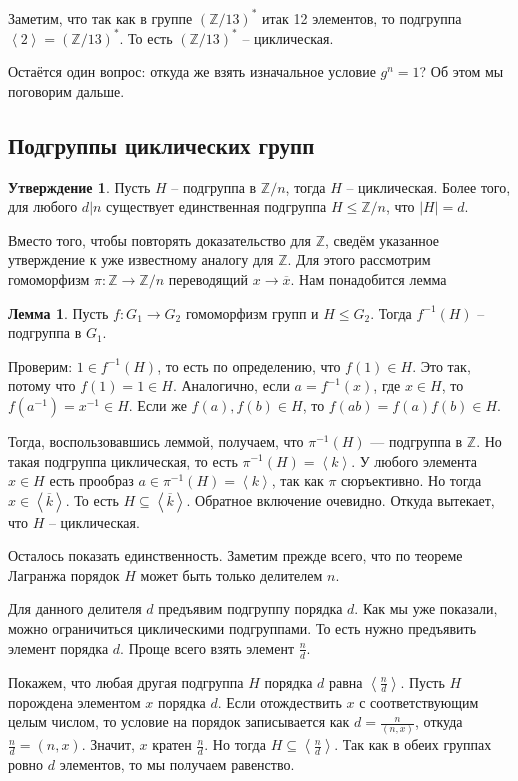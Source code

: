 \documentclass[10pt,a4paper,oneside]{book}
\theoremstyle{definition}
\newtheorem{lem}{\color{green!50!black}Лемма}
\newtheorem{utvr}{\color{blue!50!black}Утверждение}
\renewcommand{\leq}{\leqslant}
\newcommand{\mb}[1]{\mathbb{#1}}
\newcommand{\ovl}{\overline}
\def\lan{\left\langle }
\def\ran{\right\rangle}
\def\lm{\begin{lem}}
\def\elm{\end{lem}}
\def\utv{\begin{utvr}}
\def\eutv{\end{utvr}}
\begin{document}
Заметим, что так как в группе $(\mb Z/13)^*$ итак 12 элементов, то подгруппа $\lan 2\ran =(\mb Z/13)^*$. То есть $(\mb Z/13)^*$ -- циклическая.

Остаётся один вопрос: откуда же взять изначальное условие $g^n=1$? Об этом мы поговорим дальше.

\subsection{Подгруппы циклических групп}

\utv Пусть $H$ -- подгруппа в $\mb Z/n$, тогда $H$ -- циклическая. Более того, для любого $d|n$ существует единственная подгруппа $H\leq \mb Z/n$, что $|H|=d$. 
\eutv
\proof
Вместо того, чтобы повторять доказательство для $\mb Z$, сведём указанное утверждение к уже известному аналогу для $\mb Z$. Для этого рассмотрим гомоморфизм $\pi\colon \mb Z \to \mb Z/n$ переводящий $x\to \ovl{x}$. Нам понадобится лемма

\lm Пусть $f\colon G_1\to G_2$ гомоморфизм групп и $H\leq G_2$. Тогда $f^{-1}(H)$ -- подгруппа в $G_1$.
\elm
\proof Проверим: $1 \in f^{-1}(H)$, то есть по определению, что $f(1)\in H$. Это так, потому что $f(1)=1\in H$. Аналогично, если $a=f^{-1}(x)$, где $x \in H$, то $f(a^{-1})=x^{-1}\in H$. Если же $f(a), f(b) \in H$, то $f(ab)=f(a)f(b)\in H$. 
\endproof

Тогда, воспользовавшись леммой, получаем, что  $\pi^{-1}(H)$ ---  подгруппа в $\mb Z$. Но такая подгруппа циклическая, то есть $\pi^{-1}(H)=\lan k \ran$. У любого элемента $x\in H$ есть прообраз $a\in \pi^{-1}(H)=\lan k \ran$, так как $\pi$ сюръективно. Но тогда $x\in \lan \ovl{k} \ran$. То есть $H\subseteq \lan \ovl{k}\ran$. Обратное включение очевидно. Откуда вытекает, что $H$ -- циклическая.

Осталось показать единственность. Заметим прежде всего, что по теореме Лагранжа порядок $H$ может быть только делителем $n$.

Для данного делителя $d$ предъявим подгруппу порядка $d$. Как мы уже показали, можно ограничиться циклическими подгруппами. То есть нужно предъявить элемент порядка $d$. Проще всего взять элемент $\frac{n}{d}$.

Покажем, что любая другая подгруппа $H$ порядка $d$ равна $\lan \frac{n}{d} \ran$. Пусть $H$ порождена элементом $x$ порядка $d$. Если отождествить $x$ с соответствующим целым числом, то условие на порядок записывается как  $d=\frac{n}{(n,x)}$, откуда $\frac{n}{d}=(n,x)$. Значит, $x$ кратен $\frac{n}{d}$. Но тогда $H \subseteq \lan\frac{n}{d}\ran$. Так как в обеих группах ровно $d$ элементов, то мы получаем равенство.
\endproof
\end{document}
